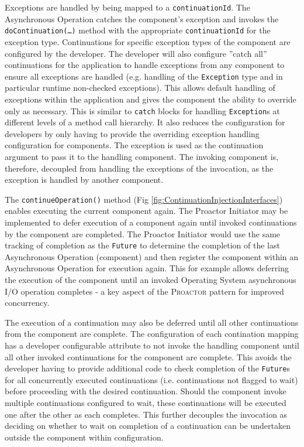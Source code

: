 \documentclass[prodmode]{style/acmlarge}
\begin{document}
Exceptions are handled by being mapped to a \texttt{continuationId}.  The
Asynchronous Operation catches the component's exception and invokes the
\texttt{doContinuation(\ldots)} method with the appropriate
\texttt{continuationId} for the exception type.  Continuations for specific
exception types of the component are configured by the developer.  The developer
will also configure ''catch all'' continuations for the application to handle
exceptions from any component to ensure all exceptions are handled (e.g.
handling of the \texttt{Exception} type and in particular runtime non-checked
exceptions).  This allows default handling of exceptions within the application
and gives the component the ability to override only as necessary.  This is
similar to \texttt{catch} blocks for handling \texttt{Exception}s at different
levels of a method call hierarchy.  It also reduces the configuration for
developers by only having to provide the overriding exception handling
configuration for components.  The exception is used as the continuation
argument to pass it to the handling component.  The invoking component is,
therefore, decoupled from handling the exceptions of the invocation, as the
exception is handled by another component.

The \texttt{continueOperation()} method (Fig
\ref{fig:ContinuationInjectionInterfaces}) enables executing the current
component again.  The Proactor Initiator may be implemented to defer execution
of a component again until invoked continuations by the component are completed.
 The Proactor Initiator would use the same tracking of completion as the
\texttt{Future} to determine the completion of the last Asynchronous Operation
(component) and then register the component within an Asynchronous Operation for
execution again.  This for example allows deferring the execution of the
component until an invoked Operating System asynchronous I/O operation completes
- a key aspect of the \textsc{Proactor} pattern for improved concurrency.

The execution of a continuation may also be deferred until all other
continuations from the component are complete.  The configuration of each
contination mapping has a developer configurable attribute to not invoke the
handling component until all other invoked continuations for the component are
complete.  This avoids the developer having to provide additional code to check
completion of the \texttt{Future}s for all concurrently executed continuations
(i.e. continuations not flagged to wait) before proceeding with the desired
continuation.  Should the component invoke multiple continuations configured to
wait, these continuations will be executed one after the other as each
completes.  This further decouples the invocation as deciding on whether to wait
on completion of a continuation can be undertaken outside the component within
configuration.
\end{document}
